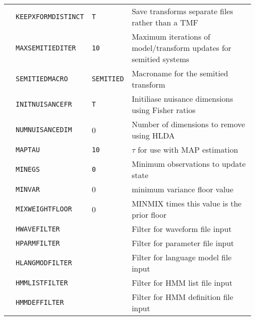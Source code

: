\begin{center}
\begin{supertabular}{|p{1.8cm}|l|l|p{6.6cm}|}
  & \texttt{KEEPXFORMDISTINCT} & \texttt{T} & Save transforms separate files rather than a TMF \\ 


  & \texttt{MAXSEMITIEDITER} & \texttt{10} & Maximum iterations of model/transform updates for semitied systems \\ 


  & \texttt{SEMITIEDMACRO} & \texttt{SEMITIED} & Macroname for the semitied transform\\ 


  & \texttt{INITNUISANCEFR} & \texttt{T} & Initiliase nuisance dimensions using Fisher ratios\\ 


  & \texttt{NUMNUISANCEDIM} & 0 & Number of dimensions to remove using HLDA\\ \hline













  & \texttt{MAPTAU} & \texttt{10} & $\tau$ for use with MAP estimation \\ 


  & \texttt{MINEGS} & \texttt{0} & Minimum observations to update state \\ 


  & \texttt{MINVAR} & 0 & minimum variance floor value \\ 


  & \texttt{MIXWEIGHTFLOOR} & 0 & MINMIX times this value is the prior floor \\ \hline





 & \texttt{HWAVEFILTER}    & & Filter for waveform file input\\ 


 & \texttt{HPARMFILTER}    & & Filter for parameter file input\\ 


 & \texttt{HLANGMODFILTER} & & Filter for language model file input\\ 


 & \texttt{HMMLISTFILTER}  & & Filter for HMM list file input\\ 


 & \texttt{HMMDEFFILTER}   & & Filter for HMM definition file input\\ 



\end{supertabular}
\end{center}
